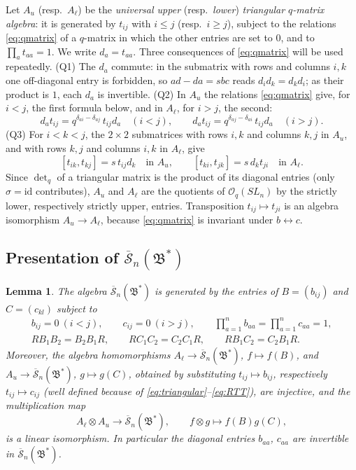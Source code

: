 \documentclass[12pt]{article}
\newtheorem{lemma}[theorem]{Lemma}
\theoremstyle{remark}
\newcommand{\redS}{\overline{\mathcal S}_n}
\newcommand{\Bstar}{\mathfrak B^*}
\newcommand{\ot}{\otimes}
\newcommand{\id}{\mathrm{id}}
\newcommand{\Oq}{\mathcal O_q(SL_n)}
\begin{document}
Let $A_u$ (resp.\ $A_\ell$) be the \emph{universal upper} (resp.\
\emph{lower}) \emph{triangular $q$-matrix algebra}: it is generated by
$t_{ij}$ with $i\le j$ (resp.\ $i\ge j$), subject to the relations
\eqref{eq:qmatrix} of a $q$-matrix in which the other entries are set
to $0$, and to $\prod_at_{aa}=1$. We write $d_a=t_{aa}$. Three
consequences of \eqref{eq:qmatrix} will be used repeatedly.
(Q1) The $d_a$ commute: in the submatrix with rows and columns $i,k$
one off-diagonal entry is forbidden, so $ad-da=sbc$ reads
$d_id_k=d_kd_i$; as their product is $1$, each $d_a$ is invertible.
(Q2) In $A_u$ the relations \eqref{eq:qmatrix} give, for $i<j$, the
first formula below, and in $A_\ell$, for $i>j$, the second:
\begin{equation}\label{eq:toralmatrix}
 d_at_{ij}=q^{\delta_{ai}-\delta_{aj}}\,t_{ij}d_a\quad(i<j),\qquad
 d_at_{ij}=q^{\delta_{aj}-\delta_{ai}}\,t_{ij}d_a\quad(i>j).
\end{equation}
(Q3) For $i<k<j$, the $2\times2$ submatrices with rows $i,k$ and
columns $k,j$ in $A_u$, and with rows $k,j$ and columns $i,k$ in $A_\ell$,
give
\begin{equation}\label{eq:upperrec}
 [t_{ik},t_{kj}]=s\,t_{ij}d_k\quad\text{in }A_u,\qquad
 [t_{ki},t_{jk}]=s\,d_kt_{ji}\quad\text{in }A_\ell .
\end{equation}
Since $\det_q$ of a triangular matrix is the product of its diagonal
entries (only $\sigma=\id$ contributes), $A_u$ and $A_\ell$ are the
quotients of $\Oq$ by the strictly lower, respectively strictly upper,
entries. Transposition $t_{ij}\mapsto t_{ji}$ is an algebra isomorphism
$A_u\to A_\ell$, because \eqref{eq:qmatrix} is invariant under
$b\leftrightarrow c$.

\subsection{Presentation of \texorpdfstring{$\redS(\Bstar)$}{the reduced algebra}}

\begin{lemma}\label{lem:skein}
The algebra $\redS(\Bstar)$ is generated by the entries of
$B=(b_{ij})$ and $C=(c_{kl})$ subject to
\begin{gather}
 b_{ij}=0\ (i<j),\qquad c_{ij}=0\ (i>j),\qquad
 \prod_{a=1}^n b_{aa}=\prod_{a=1}^n c_{aa}=1, \label{eq:triangular}\\
 RB_1B_2=B_2B_1R,\qquad
 RC_1C_2=C_2C_1R,\qquad
 RB_1C_2=C_2B_1R. \label{eq:RTT}
\end{gather}
Moreover, the algebra homomorphisms $A_\ell\to\redS(\Bstar)$,
$f\mapsto f(B)$, and $A_u\to\redS(\Bstar)$, $g\mapsto g(C)$, obtained
by substituting $t_{ij}\mapsto b_{ij}$, respectively $t_{ij}\mapsto
c_{ij}$ (well defined because of
\eqref{eq:triangular}--\eqref{eq:RTT}), are injective, and the
multiplication map
\begin{equation}\label{eq:skeinfactor}
 A_\ell\ot A_u\longrightarrow\redS(\Bstar),\qquad
 f\ot g\longmapsto f(B)g(C),
\end{equation}
is a linear isomorphism. In particular the diagonal entries
$b_{aa}$, $c_{aa}$ are invertible in $\redS(\Bstar)$.
\end{lemma}
\end{document}
